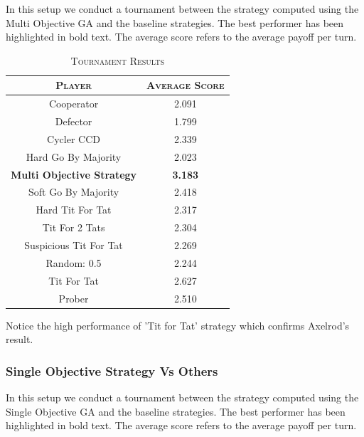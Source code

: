 \documentclass[a4paper]{article}
\begin{document}
	In this setup we conduct a tournament between the strategy computed using the Multi Objective GA and the baseline strategies. The best performer has been highlighted in bold text. The average score refers to the average payoff per turn.

	\begin{table}[H]
	  \begin{center}
	    \begin{tabular}{c|c}
	      \toprule
	      \textsc{Player} & \textsc{Average Score}\\
	      \midrule
			Cooperator & 2.091\\
			Defector & 1.799\\
			Cycler CCD & 2.339\\
			Hard Go By Majority & 2.023\\
			\textbf{Multi Objective Strategy} & \textbf{3.183}\\
			Soft Go By Majority & 2.418\\
			Hard Tit For Tat & 2.317\\
			Tit For 2 Tats & 2.304\\
			Suspicious Tit For Tat & 2.269\\
			Random: 0.5 & 2.244\\
			Tit For Tat & 2.627\\
			Prober & 2.510\\
		  \bottomrule
	    \end{tabular}
	    \caption{\textsc{Tournament Results}}
	  \end{center}
	\end{table}  

	Notice the high performance of 'Tit for Tat' strategy which confirms Axelrod's result.

	\subsubsection{Single Objective Strategy Vs Others}

In this setup we conduct a tournament between the strategy computed using the Single Objective GA and the baseline strategies. The best performer has been highlighted in bold text. The average score refers to the average payoff per turn.
	
\end{document}
